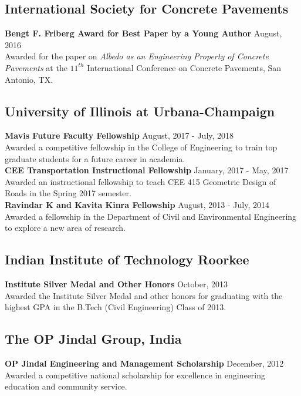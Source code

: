 \documentclass[12pt]{article}
\begin{document}
\subsection*{International Society for Concrete Pavements}
\textbf{Bengt F. Friberg Award for Best Paper by a Young Author} \hfill August, 2016 \\
Awarded for the paper on \textit{Albedo as an Engineering Property of Concrete Pavements} at the $11^{th}$ International Conference on Concrete Pavements, San Antonio, TX. \\

\subsection*{University of Illinois at Urbana-Champaign} 
\textbf{Mavis Future Faculty Fellowship} \hfill August, 2017 - July, 2018 \\
Awarded a competitive fellowship in the College of Engineering to train top graduate students for a future career in academia. \\

\textbf{CEE Transportation Instructional Fellowship} \hfill January, 2017 - May, 2017 \\
Awarded an instructional fellowship to teach CEE 415 Geometric Design of Roads in the Spring 2017 semester. \\

\textbf{Ravindar K and Kavita Kinra Fellowship} \hfill August, 2013 - July, 2014 \\
Awarded a fellowship in the Department of Civil and Environmental Engineering to explore a new area of research. \\

\subsection*{Indian Institute of Technology Roorkee} 
\textbf{Institute Silver Medal and Other Honors} \hfill October, 2013 \\
Awarded the Institute Silver Medal and other honors for graduating with the highest GPA in the B.Tech (Civil Engineering) Class of 2013. \\

\subsection*{The OP Jindal Group, India} 
\textbf{OP Jindal Engineering and Management Scholarship} \hfill December, 2012 \\
Awarded a competitive national scholarship for excellence in engineering education and community service. \\
\end{document}
